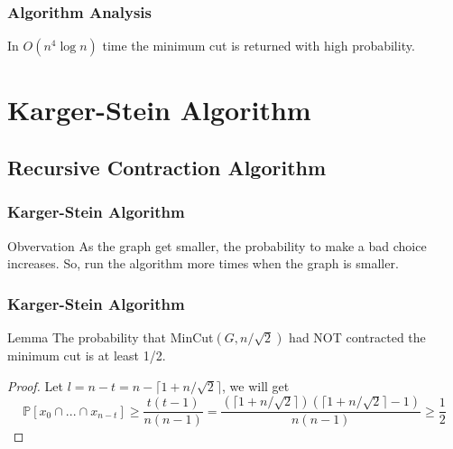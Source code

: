 \documentclass[compress,blue]{beamer}
\begin{document}
	\begin{frame}[c]
	\frametitle{Algorithm Analysis}
	\begin{theorem}
	In $ O(n^4 \log n) $ time the minimum cut is returned with high probability.
	\end{theorem}
	\end{frame}	
	
\section{Karger-Stein Algorithm}
	\subsection{Recursive Contraction Algorithm}
	\begin{frame}[c]
	\frametitle{Karger-Stein Algorithm}
	
	\begin{block}{Obvervation}
	As the graph get smaller, the probability to make a bad choice increases. So, run the algorithm more times when the graph is smaller.
	\end{block}
	\vspace{2em}
	\pause
	\end{frame}
	
	\begin{frame}[c]
	\frametitle{Karger-Stein Algorithm}
	\begin{block}{Lemma}
	The probability that MinCut$ (G,n/\sqrt{2}) $ had NOT contracted the minimum cut is at least 1/2.
	\end{block}
	\begin{proof}
	Let $ l=n-t=n-\lceil 1+n/\sqrt{2} \rceil $, we will get  \[ \mathbb{P}[x_0\cap ... \cap x_{n-t}] \geq \frac{t(t-1)}{n(n-1)}= \frac{(\lceil 1+n/\sqrt{2} \rceil)(\lceil 1+n/\sqrt{2} \rceil-1)}{n(n-1)} \geq \frac{1}{2} \]
	\end{proof}
	\end{frame}
	
\end{document}
